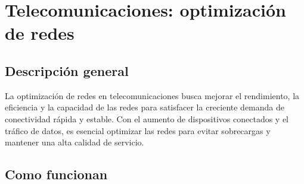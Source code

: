 \documentclass[12pt]{article}
\begin{document}
\section{Telecomunicaciones: optimización de redes}

\subsection{Descripción general}

La optimización de redes en telecomunicaciones busca mejorar el rendimiento, la eficiencia y la capacidad de las redes para 
satisfacer la creciente demanda de conectividad rápida y estable. Con el aumento de dispositivos conectados y el tráfico de datos, 
es esencial optimizar las redes para evitar sobrecargas y mantener una alta calidad de servicio.

\subsection{Como funcionan}
\end{document}
